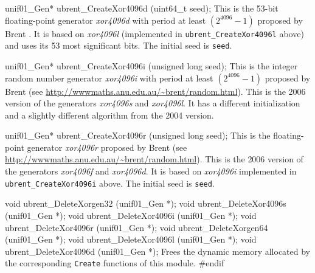 unif01_Gen* ubrent_CreateXor4096d (uint64_t seed);
\endcode
  \tab This is the 53-bit floating-point generator \textit{xor4096d}
 with period at least $(2^{4096}-1)$ proposed by Brent \cite{rBRE04a}.
  It is based on \textit{xor4096l} (implemented in \texttt{ubrent\_CreateXor4096l}
  above) and uses its 53  most significant bits. The initial seed is \texttt{seed}.
%
 \endtab
\code

\endcode

\code

unif01_Gen* ubrent_CreateXor4096i (unsigned long seed);
\endcode
  \tab This is the %
  integer random number generator  \textit{xor4096i} with period at least
 $(2^{4096}-1)$ proposed by Brent (see 
  \url{http://wwwmaths.anu.edu.au/~brent/random.html}).  This is the
   {2006 version} of the generators \textit{xor4096s} and
  \textit{xor4096l}. It has a different initialization and a slightly 
  different algorithm from the 2004 version.
%
  \endtab
\code


unif01_Gen* ubrent_CreateXor4096r (unsigned long seed);
\endcode
  \tab This is the floating-point generator \textit{xor4096r} proposed by Brent
  (see \url{http://wwwmaths.anu.edu.au/~brent/random.html}).
  This is the {2006 version} of the generators \textit{xor4096f} and
  \textit{xor4096d}. It is based on \textit{xor4096i} implemented in
  \texttt{ubrent\_CreateXor4096i} above. The initial seed is \texttt{seed}.
%
 \endtab


\code

void ubrent_DeleteXorgen32 (unif01_Gen *);
void ubrent_DeleteXor4096s (unif01_Gen *);
void ubrent_DeleteXor4096i (unif01_Gen *);
void ubrent_DeleteXor4096r (unif01_Gen *);
void ubrent_DeleteXorgen64 (unif01_Gen *);
void ubrent_DeleteXor4096l (unif01_Gen *);
void ubrent_DeleteXor4096d (unif01_Gen *);
\endcode
  \tab Frees the dynamic memory allocated by the corresponding
  \texttt{Create} functions of this module. \endtab
\code\hide
#endif
\endhide\endcode
